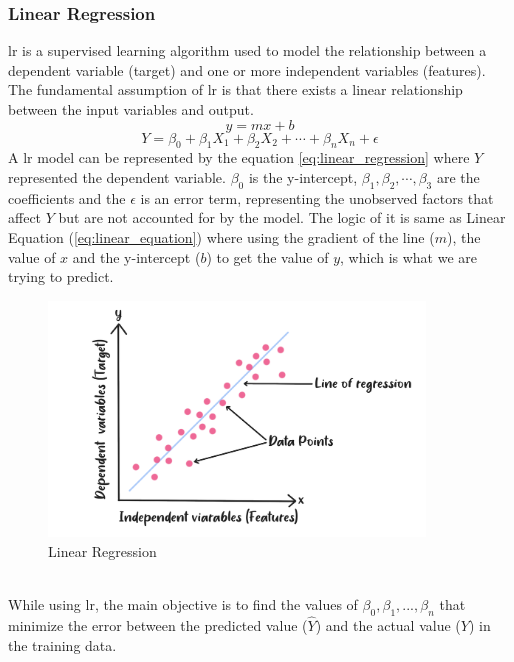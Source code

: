 \subsubsection{Linear Regression}
\nocite{mali_2021_linear}
\nocite{rohithgandhi_2018_introduction}
\nocite{kwiatkowski_2021_gradient,ibm_what}
\nocite{_2019_descending}
\gls{lr} is a supervised learning algorithm used to model the relationship between a dependent variable (target) and one or more independent variables (features).
The fundamental assumption of \gls{lr} is that there exists a linear relationship between the input variables and output. \cite{ibm_2022_about}
\begin{equation} \label{eq:linear_equation}
    y = mx + b
\end{equation}
\begin{equation} \label{eq:linear_regression}
    Y = \beta_0 + \beta_{1}X_{1} + \beta_{2}X_{2} + \cdots + \beta_{n}X_{n} + \epsilon
\end{equation}
\indent A \gls{lr} model can be represented by the equation \ref{eq:linear_regression} where $Y$ represented the dependent variable. 
$\beta_0$ is the y-intercept, $\beta_1, \beta_2, \cdots, \beta_3$ are the coefficients  and the $\epsilon$ is an error term, representing the unobserved factors that affect $Y$ but are not accounted for by the model.
The logic of it is same as Linear Equation (\ref{eq:linear_equation}) where using the gradient of the line ($m$), the value of $x$ and the y-intercept ($b$) to get the value of $y$, which is what we are trying to predict. 
\\
\begin{figure}[!ht]
    \centering
    \includegraphics[width=10cm]{Images/lr.png}
    \caption{Linear Regression}
    \label{fig:lr}
\end{figure}
\\
\indent While using \gls{lr}, the main objective is to find the values of $\beta_0, \beta_1,...,\beta_n$ that minimize the error between the predicted value ($\hat{Y}$) and the actual value ($Y$) in the training data.
